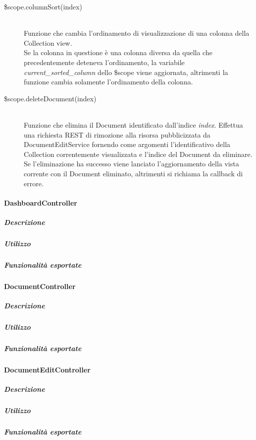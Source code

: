 \begin{description}
 \item[\$scope.columnSort(index)] \hfill \\
 Funzione che cambia l'ordinamento di visualizzazione di una colonna della Collection view. \\
 Se la colonna in questione è una colonna diversa da quella che precedentemente deteneva l'ordinamento,
 la variabile \emph{current_sorted_column} dello \$scope viene aggiornata, altrimenti la funzione cambia solamente
 l'ordinamento della colonna.
 
 \item[\$scope.deleteDocument(index)] \hfill \\
 Funzione che elimina il Document identificato dall'indice \emph{index}. Effettua una richiesta REST di rimozione alla risorsa
 pubblicizzata da DocumentEditService fornendo come argomenti l'identificativo della Collection correntemente visualizzata e l'indice
 del Document da eliminare. \\
 Se l'eliminazione ha successo viene lanciato l'aggiornamento della vista corrente con il Document eliminato, altrimenti si
 richiama la callback di errore.
 
 
\end{description}


\paragraph{DashboardController}
\subparagraph{Descrizione}

\subparagraph{Utilizzo}

\subparagraph{Funzionalità esportate}

\paragraph{DocumentController}
\subparagraph{Descrizione}

\subparagraph{Utilizzo}

\subparagraph{Funzionalità esportate}

\paragraph{DocumentEditController}
\subparagraph{Descrizione}

\subparagraph{Utilizzo}

\subparagraph{Funzionalità esportate}



